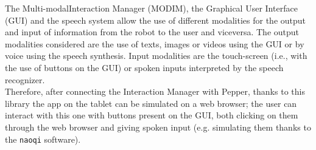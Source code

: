 \documentclass[12pt, letterpaper, twoside]{article}
\begin{document}
The Multi-modalInteraction Manager (MODIM), the Graphical User Interface (GUI) and the speech system allow the use of different modalities for the output and input of information from the robot to the user and viceversa. The output modalities considered are the use of texts, images or videos using the GUI or by voice using the speech synthesis. Input modalities are the touch-screen (i.e., with the use of buttons on the GUI) or spoken inputs interpreted by the speech recognizer.\\

Therefore, after connecting the Interaction Manager with Pepper, thanks to this library the app on the tablet can be simulated on a web browser; the user can interact with this one with buttons present on the GUI, both clicking on them through the web browser and giving spoken input (e.g. simulating them thanks to the \verb|naoqi| software).
\end{document}
